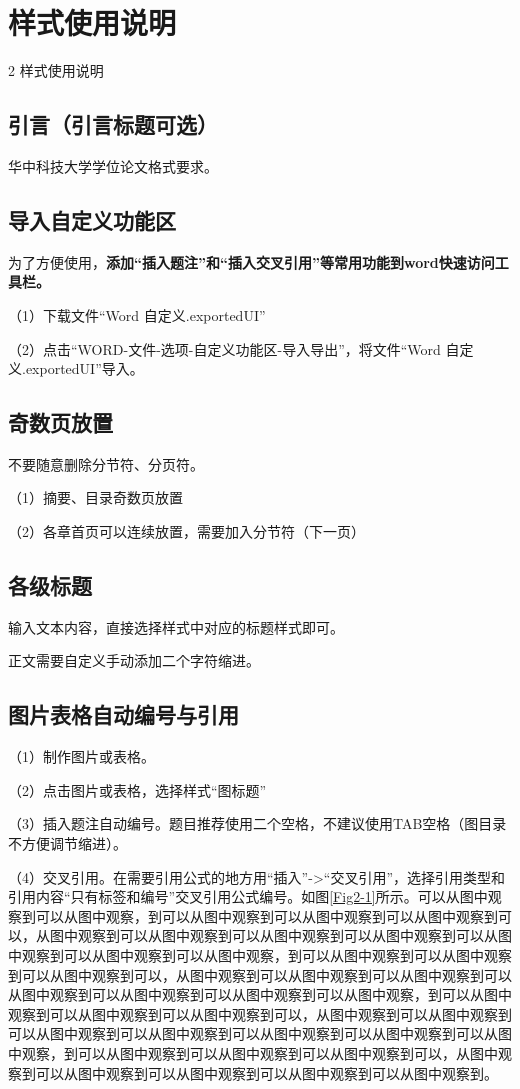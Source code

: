 

\chapter{样式使用说明}
\label{cha:command}
{2 \quad 样式使用说明}

\section{引言（引言标题可选）}
\label{sec:cover}
华中科技大学学位论文格式要求。

\section{导入自定义功能区}
为了方便使用，\textbf{添加“插入题注”和“插入交叉引用”等常用功能到word快速访问工具栏。}

（1）下载文件“Word 自定义.exportedUI”

（2）点击“WORD-文件-选项-自定义功能区-导入导出”，将文件“Word 自定义.exportedUI”导入。


\section{奇数页放置}
不要随意删除分节符、分页符。

（1）摘要、目录奇数页放置

（2）各章首页可以连续放置，需要加入分节符（下一页）

\section{各级标题}
输入文本内容，直接选择样式中对应的标题样式即可。

正文需要自定义手动添加二个字符缩进。


\section{图片表格自动编号与引用}
（1）制作图片或表格。

（2）点击图片或表格，选择样式“图标题”

（3）插入题注自动编号。题目推荐使用二个空格，不建议使用TAB空格（图目录不方便调节缩进）。

（4）交叉引用。在需要引用公式的地方用“插入”->“交叉引用”，选择引用类型和引用内容“只有标签和编号”交叉引用公式编号。如图\ref{Fig2-1}所示。可以从图中观察到可以从图中观察，到可以从图中观察到可以从图中观察到可以从图中观察到可以，从图中观察到可以从图中观察到可以从图中观察到可以从图中观察到可以从图中观察到可以从图中观察到可以从图中观察，到可以从图中观察到可以从图中观察到可以从图中观察到可以，从图中观察到可以从图中观察到可以从图中观察到可以从图中观察到可以从图中观察到可以从图中观察到可以从图中观察，到可以从图中观察到可以从图中观察到可以从图中观察到可以，从图中观察到可以从图中观察到可以从图中观察到可以从图中观察到可以从图中观察到可以从图中观察到可以从图中观察，到可以从图中观察到可以从图中观察到可以从图中观察到可以，从图中观察到可以从图中观察到可以从图中观察到可以从图中观察到可以从图中观察到。


